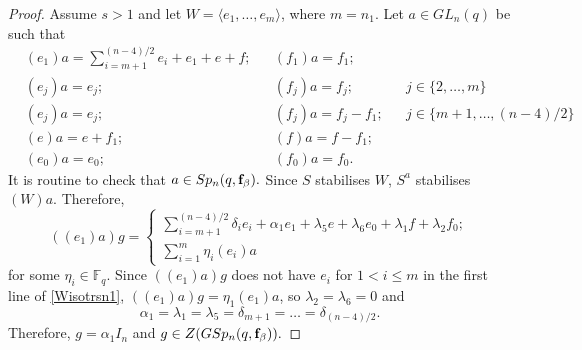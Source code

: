 \begin{proof}
Assume $s>1$ and let $W=\langle e_1, \ldots, e_{m} \rangle$, where $m=n_1.$  Let $a \in GL_n(q)$ be such that 
\begin{equation*}%
\begin{aligned}
&(e_1)a =\sum_{i=m+1}^{(n-4)/2} e_i +e_1 +e+ f; & & (f_1)a=f_1; \\
&(e_{j})a = e_j;  & &(f_{j})a=f_{j};  && j\in \{2, \ldots, m \}   \\
&(e_{j})a =e_j;  & &(f_{j})a=f_{j} - f_1;  && j\in \{m+1, \ldots, (n-4)/2 \}   \\
& (e)a=e+f_1; & & (f)a=f-f_1; \\
& (e_0)a=e_0; & & (f_0)a=f_0.
\end{aligned}
\end{equation*}
 It is routine to check that $a \in Sp_n(q, {\bf f}_{\beta}).$   Since $S$ stabilises  $W$,  $S^a$ stabilises $(W)a.$ %
 Therefore, 
\begin{equation}\label{Wisotrsn1}
((e_1)a)g=
\begin{cases}
\sum_{i=m+1}^{(n-4)/2}\delta_i e_i +\alpha_1e_1 + \lambda_5 e+ \lambda_6 e_0 +\lambda_1 f + \lambda_2 f_0;\\
\sum_{i=1}^{m} \eta_i (e_i)a
\end{cases}
\end{equation}
for some $\eta_i \in \mathbb{F}_q.$
Since $((e_1)a)g$ does not have $e_i$ for $1<i  \le m$  in the first line of \eqref{Wisotrsn1}, $((e_1 )a)g = \eta_1 (e_1 )a$, so $\lambda_2=\lambda_6=0$ and
$$\alpha_1=\lambda_1=\lambda_5=\delta_{m+1}= \ldots= \delta_{(n-4)/2}.$$
Therefore, $g=\alpha_1I_n$ and  $g \in Z(GSp_n(q, {\bf f}_{\beta})).$


\end{proof}
